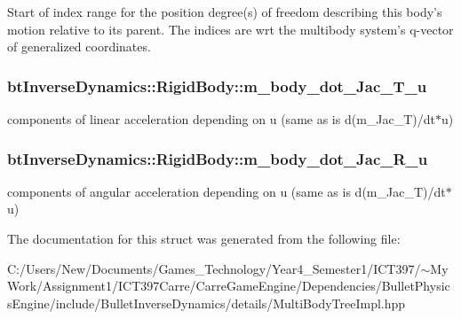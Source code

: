 Start of index range for the position degree(s) of freedom describing this body's motion relative to its parent. The indices are wrt the multibody system's q-vector of generalized coordinates. \hypertarget{structbt_inverse_dynamics_1_1_rigid_body_5b544206431b83f7e8f72004add66029}{
\subsubsection[m\_\-body\_\-dot\_\-Jac\_\-T\_\-u]{ {\bf btInverseDynamics::RigidBody::m\_\-body\_\-dot\_\-Jac\_\-T\_\-u}}}
\label{structbt_inverse_dynamics_1_1_rigid_body_5b544206431b83f7e8f72004add66029}


components of linear acceleration depending on u (same as is d(m\_\-Jac\_\-T)/dt$\ast$u) \hypertarget{structbt_inverse_dynamics_1_1_rigid_body_aabe7b9e48f3eb97fdfe8f764beb919f}{
\subsubsection[m\_\-body\_\-dot\_\-Jac\_\-R\_\-u]{ {\bf btInverseDynamics::RigidBody::m\_\-body\_\-dot\_\-Jac\_\-R\_\-u}}}
\label{structbt_inverse_dynamics_1_1_rigid_body_aabe7b9e48f3eb97fdfe8f764beb919f}


components of angular acceleration depending on u (same as is d(m\_\-Jac\_\-T)/dt$\ast$u) 

The documentation for this struct was generated from the following file:\begin{CompactItemize}
\item 
C:/Users/New/Documents/Games\_\-Technology/Year4\_\-Semester1/ICT397/$\sim$My Work/Assignment1/ICT397Carre/CarreGameEngine/Dependencies/BulletPhysicsEngine/include/BulletInverseDynamics/details/MultiBodyTreeImpl.hpp\end{CompactItemize}
